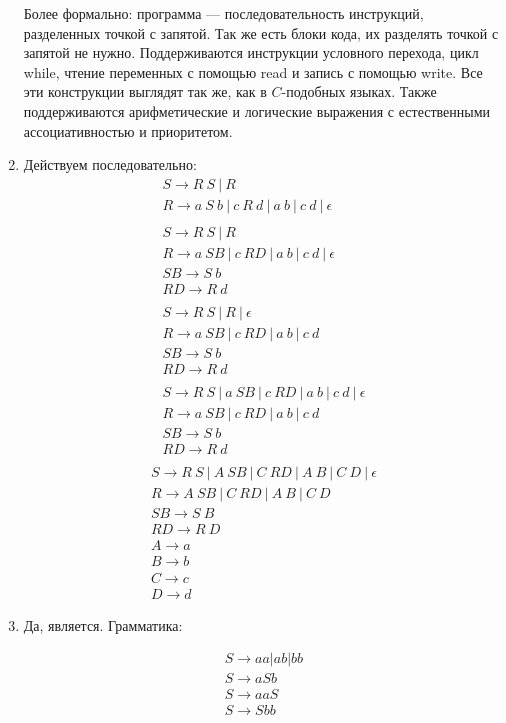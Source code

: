 \documentclass[14pt]{extarticle}
\begin{document}
\begin{enumerate}
          Более формально: программа --- последовательность инструкций, разделенных точкой с
          запятой. Так же есть блоки кода, их разделять точкой с запятой не нужно. Поддерживаются
          инструкции условного перехода, цикл while, чтение переменных с помощью read и запись с помощью
          write. Все эти конструкции выглядят так же, как в $C$-подобных языках. Также поддерживаются
          арифметические и логические выражения с естественными ассоциативностью и приоритетом.
    \item Действуем последовательно:
          \begin{gather*}
              S \to R\ S\ |\ R\\
              R \to a\ S\ b\ |\ c\ R\ d\ |\ a\ b\ |\ c\ d\ |\ \epsilon\\
              \\
              S \to R\ S\ |\ R\\
              R \to a\ SB\ |\ c\ RD\ |\ a\ b\ |\ c\ d\ |\ \epsilon\\
              SB \to S\ b\\
              RD \to R\ d\\
              \\
              S \to R\ S\ |\ R\ |\ \epsilon\\
              R \to a\ SB\ |\ c\ RD\ |\ a\ b\ |\ c\ d\ \\
              SB \to S\ b\\
              RD \to R\ d\\
              \\
              S \to R\ S\ |\ a\ SB\ |\ c\ RD\ |\ a\ b\ |\ c\ d\ |\ \epsilon\\
              R \to a\ SB\ |\ c\ RD\ |\ a\ b\ |\ c\ d\ \\
              SB \to S\ b\\
              RD \to R\ d\\
          \end{gather*}
          \begin{gather*}
              S \to R\ S\ |\ A\ SB\ |\ C\ RD\ |\ A\ B\ |\ C\ D\ |\ \epsilon\\
              R \to A\ SB\ |\ C\ RD\ |\ A\ B\ |\ C\ D\ \\
              SB \to S\ B\\
              RD \to R\ D\\
              A \to a\\
              B \to b\\
              C \to c\\
              D \to d
          \end{gather*}
    \item Да, является. Грамматика:

          \begin{gather*}
              S \to aa | ab | bb\\
              S \to a S b\\
              S \to aaS\\
              S \to Sbb
          \end{gather*}
\end{enumerate}
\end{document}
